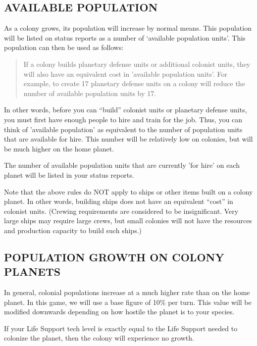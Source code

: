 \documentclass[10pt,titlepage]{article}
\begin{document}
\subsection{AVAILABLE POPULATION}
\label{sec:availablepop}


As a colony grows, its population will increase by normal means.  This
population will be listed on status reports as a number of `available
population units'.  This population can then be used as follows:

\begin{quotation}
	If a colony builds planetary defense units or additional colonist
	units, they will also have an equivalent cost in 'available
	population units'.  For example, to create 17 planetary defense
	units on a colony will reduce the number of available population
	units by 17.\end{quotation} 

In other words, before you can ``build'' colonist units or planetary defense
units, you must first have enough people to hire and train for the job.
Thus, you can think of 'available population' as equivalent to the number of
population units that are available for hire.  This number will be relatively
low on colonies, but will be much higher on the home planet.

The number of available population units that are currently 'for hire' on each
planet will be listed in your status reports.

Note that the above rules do NOT apply to ships or other items built on a
colony planet.  In other words, building ships does not have an equivalent
``cost'' in colonist units.  (Crewing requirements are considered to be
insignificant.  Very large ships may require large crews, but small colonies
will not have the resources and production capacity to build such ships.)


\subsection{POPULATION GROWTH ON COLONY PLANETS}
\label{sec:populationgrowth}


In general, colonial populations increase at a much higher rate than on the
home planet.  In this game, we will use a base figure of 10\% per turn.  This
value will be modified downwards depending on how hostile the planet is to
your species.

If your Life Support tech level is exactly equal to the Life Support needed to
colonize the planet, then the colony will experience no growth.
\end{document}
